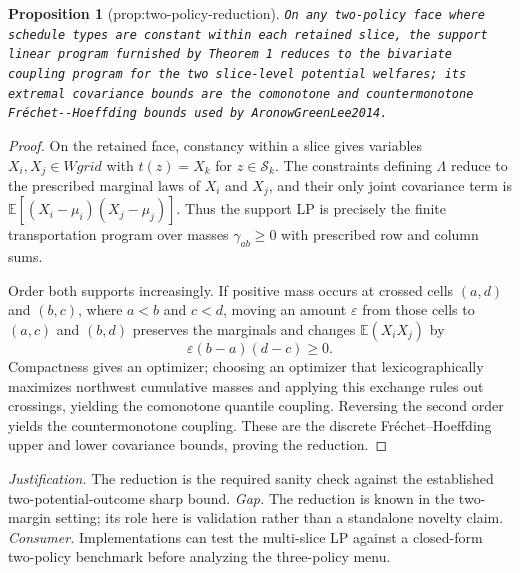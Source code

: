 \documentclass{article}
\newtheorem{proposition}{Proposition}
\begin{document}
\begin{proposition}[prop:two-policy-reduction]\label{prop:two-policy-reduction}
\texttt{On any two-\allowbreak{}policy face where schedule types are constant within each retained slice,\allowbreak{} the support linear program furnished by Theorem 1 reduces to the bivariate coupling program for the two slice-\allowbreak{}level potential welfares;\allowbreak{} its extremal covariance bounds are the comonotone and countermonotone Fréchet-\allowbreak{}-\allowbreak{}Hoeffding bounds used by AronowGreenLee2014.}
\end{proposition}
\begin{proof}
On the retained face, constancy within a slice gives variables \(X_i,X_j\in Wgrid\) with \(t(z)=X_k\) for \(z\in\mathcal S_k\).  The constraints defining \(\Lambda\) reduce to the prescribed marginal laws of \(X_i\) and \(X_j\), and their only joint covariance term is
\(\mathbb E[(X_i-\mu_i)(X_j-\mu_j)]\).  Thus the support LP is precisely the finite transportation program over masses \(\gamma_{ab}\ge0\) with prescribed row and column sums.

Order both supports increasingly.  If positive mass occurs at crossed cells \((a,d)\) and \((b,c)\), where \(a<b\) and \(c<d\), moving an amount \(\varepsilon\) from those cells to \((a,c)\) and \((b,d)\) preserves the marginals and changes \(\mathbb E(X_iX_j)\) by
\[
\varepsilon(b-a)(d-c)\ge0.
\]
Compactness gives an optimizer; choosing an optimizer that lexicographically maximizes northwest cumulative masses and applying this exchange rules out crossings, yielding the comonotone quantile coupling.  Reversing the second order yields the countermonotone coupling.  These are the discrete Fréchet--Hoeffding upper and lower covariance bounds, proving the reduction.
\end{proof}
\par\smallskip\noindent \textit{Justification.} The reduction is the required sanity check against the established two-potential-outcome sharp bound. \textit{Gap.} The reduction is known in the two-margin setting; its role here is validation rather than a standalone novelty claim. \textit{Consumer.} Implementations can test the multi-slice LP against a closed-form two-policy benchmark before analyzing the three-policy menu.
\end{document}
